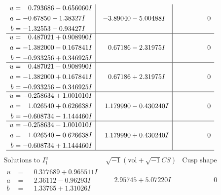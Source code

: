 \documentclass[1p]{elsarticle_modified}
\theoremstyle{definition}
\newcommand{\I}{\sqrt{-1}}
\begin{document}
$$\begin{array}{c|c|c}
\begin{aligned}
u &= \phantom{-}0.793686 - 0.656060 I \\
a &= -0.67850 - 1.38327 I \\
b &= -1.32553 - 0.93427 I\end{aligned}
 & -3.89040 - 5.00488 I & \phantom{-0.000000 } 0 \\ \hline\begin{aligned}
u &= \phantom{-}0.487021 + 0.908990 I \\
a &= -1.382000 - 0.167841 I \\
b &= -0.933256 + 0.346925 I\end{aligned}
 & \phantom{-}0.67186 - 2.31975 I & \phantom{-0.000000 } 0 \\ \hline\begin{aligned}
u &= \phantom{-}0.487021 - 0.908990 I \\
a &= -1.382000 + 0.167841 I \\
b &= -0.933256 - 0.346925 I\end{aligned}
 & \phantom{-}0.67186 + 2.31975 I & \phantom{-0.000000 } 0 \\ \hline\begin{aligned}
u &= -0.258634 + 1.001010 I \\
a &= \phantom{-}1.026540 + 0.626638 I \\
b &= -0.608734 - 1.144460 I\end{aligned}
 & \phantom{-}1.179990 - 0.430240 I & \phantom{-0.000000 } 0 \\ \hline\begin{aligned}
u &= -0.258634 - 1.001010 I \\
a &= \phantom{-}1.026540 - 0.626638 I \\
b &= -0.608734 + 1.144460 I\end{aligned}
 & \phantom{-}1.179990 + 0.430240 I & \phantom{-0.000000 } 0\\
 \hline 
 \end{array}$$\newpage$$\begin{array}{c|c|c}  
\text{Solutions to }I^u_{1}& \I (\text{vol} + \sqrt{-1}CS) & \text{Cusp shape}\\
 \hline 
\begin{aligned}
u &= \phantom{-}0.377689 + 0.965511 I \\
a &= \phantom{-}2.36112 - 0.96293 I \\
b &= \phantom{-}1.33765 + 1.31026 I\end{aligned}
 & \phantom{-}2.95745 + 5.07220 I & \phantom{-0.000000 } 0 \\ \hline\begin{aligned}

\end{aligned}
\end{array}$$
\end{document}

